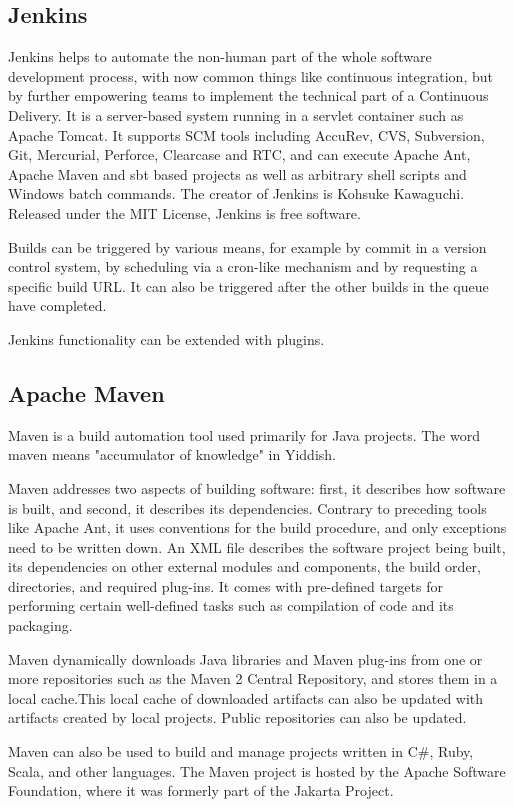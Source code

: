 \documentclass[12pt,a4paper,oneside]{report}
\begin{document}
{\subsection{Jenkins}
\par Jenkins helps to automate the non-human part of the whole software development process, with now common things like continuous integration, but by further empowering teams to implement the technical part of a Continuous Delivery. It is a server-based system running in a servlet container such as Apache Tomcat. It supports SCM tools including AccuRev, CVS, Subversion, Git, Mercurial, Perforce, Clearcase and RTC, and can execute Apache Ant, Apache Maven and sbt based projects as well as arbitrary shell scripts and Windows batch commands. The creator of Jenkins is Kohsuke Kawaguchi. Released under the MIT License, Jenkins is free software.
\par
Builds can be triggered by various means, for example by commit in a version control system, by scheduling via a cron-like mechanism and by requesting a specific build URL. It can also be triggered after the other builds in the queue have completed.
\par

Jenkins functionality can be extended with plugins.\\
\subsection{Apache Maven}
Maven is a build automation tool used primarily for Java projects. The word maven means "accumulator of knowledge" in Yiddish.
\par
Maven addresses two aspects of building software: first, it describes how software is built, and second, it describes its dependencies. Contrary to preceding tools like Apache Ant, it uses conventions for the build procedure, and only exceptions need to be written down. An XML file describes the software project being built, its dependencies on other external modules and components, the build order, directories, and required plug-ins. It comes with pre-defined targets for performing certain well-defined tasks such as compilation of code and its packaging.
\par
Maven dynamically downloads Java libraries and Maven plug-ins from one or more repositories such as the Maven 2 Central Repository, and stores them in a local cache.This local cache of downloaded artifacts can also be updated with artifacts created by local projects. Public repositories can also be updated.
\par
Maven can also be used to build and manage projects written in C\#, Ruby, Scala, and other languages. The Maven project is hosted by the Apache Software Foundation, where it was formerly part of the Jakarta Project.
}
\end{document}

